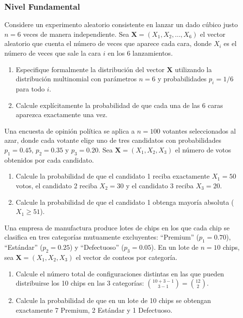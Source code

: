 \subsubsection*{Nivel Fundamental}

\begin{problema}
	\label{prob:3.8.1}
	Considere un experimento aleatorio consistente en lanzar un dado cúbico justo $n = 6$ veces de manera independiente. Sea $\bm{X} = (X_{1}, X_{2}, \dots, X_{6})$ el vector aleatorio que cuenta el número de veces que aparece cada cara, donde $X_{i}$ es el número de veces que sale la cara $i$ en los $6$ lanzamientos.
	\begin{enumerate}
		\item Especifique formalmente la distribución del vector $\bm{X}$ utilizando la distribución multinomial con parámetros $n = 6$ y probabilidades $p_{i} = 1/6$ para todo $i$.
		\item Calcule explícitamente la probabilidad de que cada una de las 6 caras aparezca exactamente una vez.
	\end{enumerate}
\end{problema}

\begin{problema}
	\label{prob:3.8.2}
	Una encuesta de opinión política se aplica a $n = 100$ votantes seleccionados al azar, donde cada votante elige uno de tres candidatos con probabilidades $p_{1} = 0.45$, $p_{2} = 0.35$ y $p_{3} = 0.20$. Sea $\bm{X} = (X_{1}, X_{2}, X_{3})$ el número de votos obtenidos por cada candidato.
	\begin{enumerate}
		\item Calcule la probabilidad de que el candidato 1 reciba exactamente $X_{1} = 50$ votos, el candidato 2 reciba $X_{2} = 30$ y el candidato 3 reciba $X_{3} = 20$.
		\item Calcule la probabilidad de que el candidato 1 obtenga mayoría absoluta ($X_{1} \ge 51$).
	\end{enumerate}
\end{problema}

\begin{problema}
	\label{prob:3.8.3}
	Una empresa de manufactura produce lotes de chips en los que cada chip se clasifica en tres categorías mutuamente excluyentes: ``Premium'' ($p_{1} = 0.70$), ``Estándar'' ($p_{2} = 0.25$) y ``Defectuoso'' ($p_{3} = 0.05$). En un lote de $n = 10$ chips, sea $\bm{X} = (X_{1}, X_{2}, X_{3})$ el vector de conteos por categoría.
	\begin{enumerate}
		\item Calcule el número total de configuraciones distintas en las que pueden distribuirse los 10 chips en las 3 categorías: $\binom{10 + 3 - 1}{3 - 1} = \binom{12}{2}$.
		\item Calcule la probabilidad de que en un lote de 10 chips se obtengan exactamente 7 Premium, 2 Estándar y 1 Defectuoso.
	\end{enumerate}
\end{problema}

